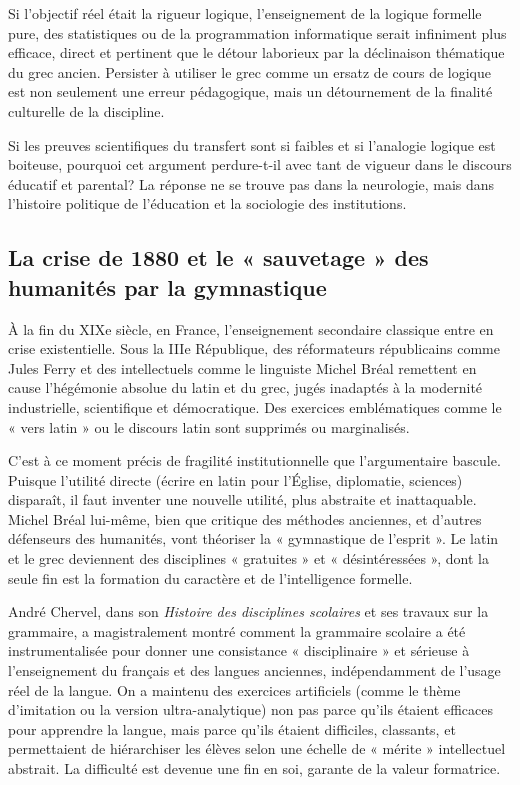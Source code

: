 Si l'objectif réel était la rigueur logique, l'enseignement de la logique formelle pure, des
statistiques ou de la programmation informatique serait infiniment plus efficace, direct et
pertinent que le détour laborieux par la déclinaison thématique du grec ancien.\cite{II-1-2-ref49}
Persister à utiliser le grec comme un ersatz de cours de logique est non seulement une erreur
pédagogique, mais un détournement de la finalité culturelle de la discipline.

Si les preuves scientifiques du transfert sont si faibles et si l'analogie logique est boiteuse,
pourquoi cet argument perdure-t-il avec tant de vigueur dans le discours éducatif et parental? La
réponse ne se trouve pas dans la neurologie, mais dans l'histoire politique de l'éducation et la
sociologie des institutions.



\subsection{La crise de 1880 et le « sauvetage » des humanités par la gymnastique}

À la fin du XIXe siècle, en France, l'enseignement secondaire classique entre en crise
existentielle. Sous la IIIe République, des réformateurs républicains comme Jules Ferry et des
intellectuels comme le linguiste Michel Bréal remettent en cause l'hégémonie absolue du latin et du
grec, jugés inadaptés à la modernité industrielle, scientifique et démocratique.\cite{II-1-2-ref12}
Des exercices emblématiques comme le « vers latin » ou le discours latin sont supprimés ou
marginalisés.

C'est à ce moment précis de fragilité institutionnelle que l'argumentaire bascule. Puisque l'utilité
directe (écrire en latin pour l'Église, diplomatie, sciences) disparaît, il faut inventer une
nouvelle utilité, plus abstraite et inattaquable. Michel Bréal lui-même, bien que critique des
méthodes anciennes, et d'autres défenseurs des humanités, vont théoriser la « gymnastique de
l'esprit ».\cite{II-1-2-ref3} Le latin et le grec deviennent des disciplines « gratuites » et «
désintéressées », dont la seule fin est la formation du caractère et de l'intelligence formelle.

André Chervel, dans son \textit{Histoire des disciplines scolaires} et ses travaux sur la grammaire,
a magistralement montré comment la grammaire scolaire a été instrumentalisée pour donner une
consistance « disciplinaire » et sérieuse à l'enseignement du français et des langues anciennes,
indépendamment de l'usage réel de la langue.\cite{II-1-2-ref11} On a maintenu des exercices
artificiels (comme le thème d'imitation ou la version ultra-analytique) non pas parce qu'ils étaient
efficaces pour apprendre la langue, mais parce qu'ils étaient difficiles, classants, et permettaient
de hiérarchiser les élèves selon une échelle de « mérite » intellectuel abstrait.\cite{II-1-2-ref62}
La difficulté est devenue une fin en soi, garante de la valeur formatrice.



